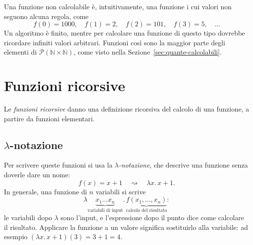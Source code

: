 \documentclass[a4paper, 11pt, oneside]{book}
\theoremstyle{formale}
\begin{document}
    Una funzione non calcolabile \`e, intuitivamente, una funzione i cui valori non
    seguono alcuna regola, come
    \begin{equation*}
        f(0) = 1000, \quad f(1) = 2, \quad f(2) = 101, \quad f(3) = 5, \quad \dots
    \end{equation*}
    Un algoritmo \`e finito, mentre per calcolare una funzione di questo tipo dovrebbe
    ricordare infiniti valori arbitrari. Funzioni cos\`i sono la maggior parte degli
    elementi di $\mathcal{P}(\mathbb{N} \times \mathbb{N})$, come visto nella
    Sezione~\ref{sec:quante-calcolabili}.

    \section{Funzioni ricorsive}
    \label{sec:funzioni-ricorsive}
    Le \emph{funzioni ricorsive} danno una definizione ricorsiva del calcolo di una
    funzione, a partire da funzioni elementari.

    \subsection{\texorpdfstring{$\lambda$}{Lambda}-notazione}
    Per scrivere queste funzioni si usa la \emph{$\lambda$-notazione}, che descrive una
    funzione senza doverle dare un nome:
    \begin{equation*}
        f(x) = x + 1
        \quad\rightsquigarrow\quad
        \lambda x.\, x + 1.
    \end{equation*}
    In generale, una funzione di $n$ variabili si scrive
    \begin{equation*}
        \lambda \underbrace{x_1 \dots x_n}_{\text{variabili di input}} .\,
        \underbrace{f(x_1, \dots, x_n)}_{\text{calcolo del risultato}}:
    \end{equation*}
    le variabili dopo $\lambda$ sono l'input, e l'espressione dopo il punto dice come
    calcolare il risultato. Applicare la funzione a un valore significa sostituirlo alla
    variabile: ad esempio $(\lambda x.\, x + 1)(3) = 3 + 1 = 4$.
\end{document}
